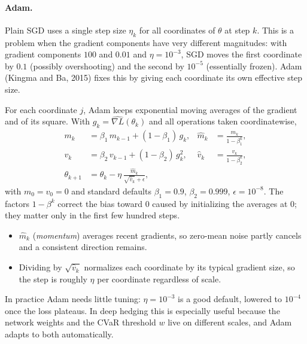 \documentclass[11pt]{article}
\theoremstyle{definition}
\theoremstyle{remark}
\begin{document}
\paragraph{Adam.} Plain SGD uses a single step size $\eta_k$ for all coordinates of $\theta$ at step $k$. This is a problem when the gradient
components have very different magnitudes: with gradient components $100$ and $0.01$ and $\eta=10^{-3}$, SGD moves the first coordinate
by $0.1$ (possibly overshooting) and the second by $10^{-5}$ (essentially frozen). Adam (Kingma and Ba, 2015) fixes this by giving each
coordinate its own effective step size.

For each coordinate $j$, Adam keeps exponential moving averages of the gradient and of its square. With $g_k=\widehat{\nabla L}(\theta_k)$
and all operations taken coordinatewise,
\begin{align*}
m_k&=\beta_1\,m_{k-1}+(1-\beta_1)\,g_k, &\hat m_k&=\frac{m_k}{1-\beta_1^k},\\
v_k&=\beta_2\,v_{k-1}+(1-\beta_2)\,g_k^2, &\hat v_k&=\frac{v_k}{1-\beta_2^k},\\
\theta_{k+1}&=\theta_k-\eta\,\frac{\hat m_k}{\sqrt{\hat v_k}+\epsilon},
\end{align*}
with $m_0=v_0=0$ and standard defaults $\beta_1=0.9$, $\beta_2=0.999$, $\epsilon=10^{-8}$. The factors $1-\beta^k$ correct the bias
toward $0$ caused by initializing the averages at $0$; they matter only in the first few hundred steps.

\begin{itemize}
  \item $\hat m_k$ (\emph{momentum}) averages recent gradients, so zero-mean noise partly cancels and a consistent direction remains.
  \item Dividing by $\sqrt{\hat v_k}$ normalizes each coordinate by its typical gradient size, so the step is roughly $\eta$ per coordinate
        regardless of scale.
\end{itemize}



In practice Adam needs little tuning: $\eta=10^{-3}$ is a good default, lowered to $10^{-4}$ once the loss plateaus. In deep hedging this is
especially useful because the network weights and the CVaR threshold $w$ live on different scales, and Adam adapts to both automatically.
\end{document}
